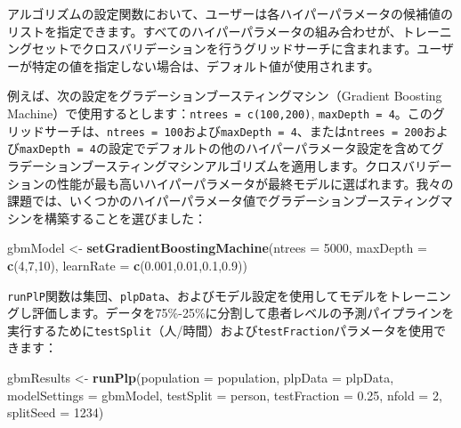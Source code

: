 \documentclass[
  11pt]{book}
\newenvironment{Shaded}{\begin{snugshade}}{\end{snugshade}}
\newcommand{\AttributeTok}[1]{\textcolor[rgb]{0.13,0.29,0.53}{#1}}
\newcommand{\DecValTok}[1]{\textcolor[rgb]{0.00,0.00,0.81}{#1}}
\newcommand{\FloatTok}[1]{\textcolor[rgb]{0.00,0.00,0.81}{#1}}
\newcommand{\FunctionTok}[1]{\textcolor[rgb]{0.13,0.29,0.53}{\textbf{#1}}}
\newcommand{\NormalTok}[1]{#1}
\newcommand{\OtherTok}[1]{\textcolor[rgb]{0.56,0.35,0.01}{#1}}
\newcommand{\StringTok}[1]{\textcolor[rgb]{0.31,0.60,0.02}{#1}}
\theoremstyle{definition}
\theoremstyle{definition}
\theoremstyle{definition}
\theoremstyle{definition}
\theoremstyle{remark}
\begin{document}
アルゴリズムの設定関数において、ユーザーは各ハイパーパラメータの候補値のリストを指定できます。すべてのハイパーパラメータの組み合わせが、トレーニングセットでクロスバリデーションを行うグリッドサーチに含まれます。ユーザーが特定の値を指定しない場合は、デフォルト値が使用されます。

例えば、次の設定をグラデーションブースティングマシン（Gradient Boosting Machine）で使用するとします：\texttt{ntrees\ =\ c(100,200)}, \texttt{maxDepth\ =\ 4}。このグリッドサーチは、\texttt{ntrees\ =\ 100}および\texttt{maxDepth\ =\ 4}、または\texttt{ntrees\ =\ 200}および\texttt{maxDepth\ =\ 4}の設定でデフォルトの他のハイパーパラメータ設定を含めてグラデーションブースティングマシンアルゴリズムを適用します。クロスバリデーションの性能が最も高いハイパーパラメータが最終モデルに選ばれます。我々の課題では、いくつかのハイパーパラメータ値でグラデーションブースティングマシンを構築することを選びました：

\begin{Shaded}
\begin{Highlighting}[]
\NormalTok{gbmModel }\OtherTok{\textless{}{-}} \FunctionTok{setGradientBoostingMachine}\NormalTok{(}\AttributeTok{ntrees =} \DecValTok{5000}\NormalTok{,}
                                       \AttributeTok{maxDepth =} \FunctionTok{c}\NormalTok{(}\DecValTok{4}\NormalTok{,}\DecValTok{7}\NormalTok{,}\DecValTok{10}\NormalTok{),}
                                       \AttributeTok{learnRate =} \FunctionTok{c}\NormalTok{(}\FloatTok{0.001}\NormalTok{,}\FloatTok{0.01}\NormalTok{,}\FloatTok{0.1}\NormalTok{,}\FloatTok{0.9}\NormalTok{))}
\end{Highlighting}
\end{Shaded}

\texttt{runPlP}関数は集団、\texttt{plpData}、およびモデル設定を使用してモデルをトレーニングし評価します。データを75\%-25\%に分割して患者レベルの予測パイプラインを実行するために\texttt{testSplit}（人/時間）および\texttt{testFraction}パラメータを使用できます：

\begin{Shaded}
\begin{Highlighting}[]
\NormalTok{gbmResults }\OtherTok{\textless{}{-}} \FunctionTok{runPlp}\NormalTok{(}\AttributeTok{population =}\NormalTok{ population,}
                     \AttributeTok{plpData =}\NormalTok{ plpData,}
                     \AttributeTok{modelSettings =}\NormalTok{ gbmModel,}
                     \AttributeTok{testSplit =} \StringTok{\textquotesingle{}person\textquotesingle{}}\NormalTok{,}
                     \AttributeTok{testFraction =} \FloatTok{0.25}\NormalTok{,}
                     \AttributeTok{nfold =} \DecValTok{2}\NormalTok{,}
                     \AttributeTok{splitSeed =} \DecValTok{1234}\NormalTok{)}
\end{Highlighting}
\end{Shaded}
\end{document}
